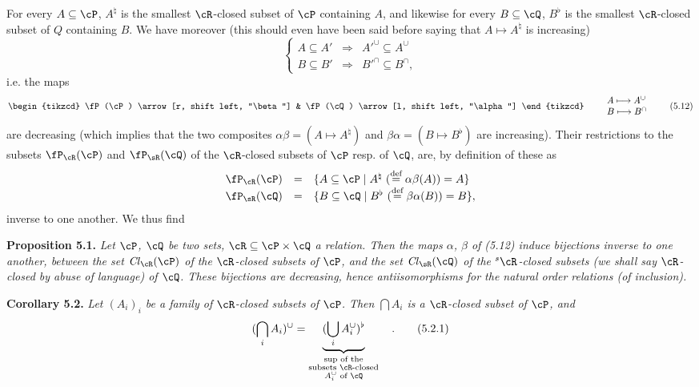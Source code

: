 For every $A \subseteq \cP$, $A^{\natural}$ is the smallest $\cR$-closed subset of $\cP$ containing $A$, and likewise for every $B \subseteq \cQ$, $B^{\flat}$ is the smallest $\cR$-closed subset of $Q$ containing $B$. We have moreover (this should even have been said before saying that $A \longmapsto A^{\natural}$ is increasing) %
\[
\left\{
\begin{array}{rcl}
A \subseteq A' & \Longrightarrow & A'^{\cup} \subseteq A^{\cup}\\[1ex]
B \subseteq B' & \Longrightarrow & B'^{\cap} \subseteq B^{\cap},
\end{array}
\right.
\tag*{(5.11)}
\]
i.e. the maps
\[
\begin{tikzcd}
\fP(\cP) \arrow[r, shift left, "\beta"] & \fP(\cQ) \arrow[l, shift left, "\alpha"]
\end{tikzcd}
\qquad
\begin{array}{l}
A \longmapsto A^{\cup}\\
B \longmapsto B^{\cap}
\end{array}
\tag*{(5.12)}
\]
are decreasing (which implies that the two composites $\alpha\beta = (A \longmapsto A^{\natural})$ and $\beta\alpha = (B \longmapsto B^{\flat})$ are increasing). Their restrictions to the subsets $\fP_{\cR}(\cP)$ and $\fP_{\sR}(\cQ)$ of the $\cR$-closed subsets of $\cP$ resp. of $\cQ$, are, by definition of these as
\[
\begin{array}{rcl}
\fP_{\cR}(\cP) & = & \{A \subseteq \cP \mid A^{\natural} \ (\overset{\text{def}}{=} \alpha\beta(A)) = A\}\\
\fP_{\sR}(\cQ) & = & \{B \subseteq \cQ \mid B^{\flat} \ (\overset{\text{def}}{=} \beta\alpha(B)) = B\},
\end{array}
\]
inverse to one another. We thus find

\textbf{Proposition 5.1.} \textit{Let $\cP$, $\cQ$ be two sets, $\cR \subseteq \cP \times \cQ$ a relation. Then the maps $\alpha$, $\beta$ of (5.12) induce bijections inverse to one}
\textit{another, between the set $\mathit{Cl}_{\cR}(\cP)$ of the $\cR$-closed subsets of $\cP$, and the set $\mathit{Cl}_{\sR}(\cQ)$ of the ${}^{s}\cR$-closed subsets (we shall say $\cR$-closed by abuse of language) of $\cQ$. These bijections are decreasing, hence antiisomorphisms for the natural order relations (of inclusion).}

\textbf{Corollary 5.2.} \textit{Let $(A_i)_i$ be a family of $\cR$-closed subsets of $\cP$. Then $\bigcap A_i$ is a $\cR$-closed subset of $\cP$, and}
\[
(\bigcap_i A_i)^{\cup} = \underbrace{(\bigcup_i A_i^{\cup})^{\flat}}_{\substack{\text{sup of the}\\ \text{subsets } \cR\text{-closed}\\ A_i^{\cup} \text{ of } \cQ}} \quad .
\tag*{(5.2.1)}
\]

